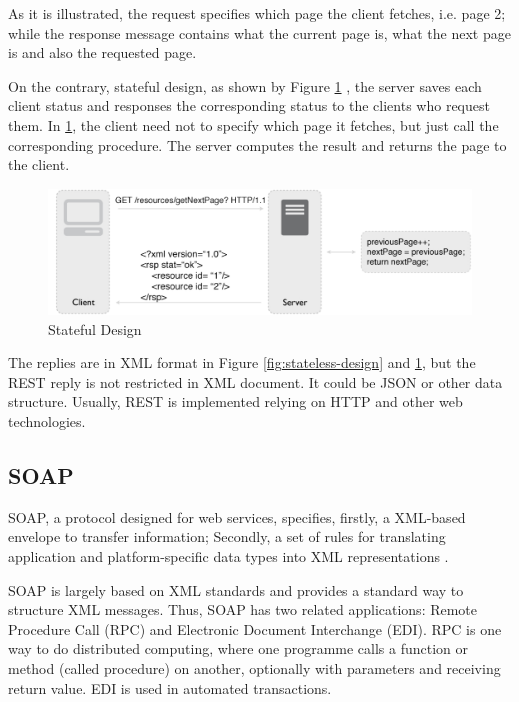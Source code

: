 As it is illustrated, the request specifies which page the client fetches, i.e. page 2; while the response message contains what the current page is, what the next page is and also the requested page.

On the contrary, stateful design, as shown by Figure \ref{fig:stateful-design} \cite{rodriguez2008restful}, the server saves each client status and responses the corresponding status to the clients who request them. In \ref{fig:stateful-design}, the client need not to specify which page it fetches, but just call the corresponding procedure. The server computes the result and returns the page to the client.

\begin{figure}[ht]
  \begin{center}
    \includegraphics[width=1\textwidth]{images/stateful-design.pdf}
    \caption{Stateful Design}
    \label{fig:stateful-design}
  \end{center}
\end{figure}

The replies are in XML format in Figure \ref{fig:stateless-design} and \ref{fig:stateful-design}, but the REST reply is not restricted in XML document. It could be JSON or other data structure. Usually, REST is implemented relying on HTTP and other web technologies. 

\subsection{SOAP}
SOAP, a protocol designed for web services, specifies, firstly, a XML-based envelope to transfer information; Secondly, a set of rules for translating application and platform-specific data types into XML representations \cite{snell2009programming}. 

SOAP is largely based on XML standards and provides a standard way to structure XML messages. Thus, SOAP has two related applications: Remote Procedure Call (RPC) and Electronic Document Interchange (EDI). RPC is one way to do distributed computing, where one programme calls a function or method (called procedure) on another, optionally with parameters and receiving return value. EDI is used in automated transactions.

